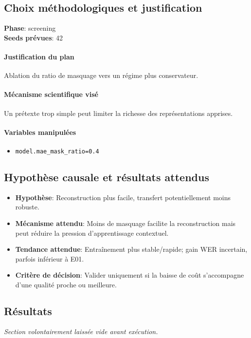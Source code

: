 \documentclass[11pt,a4paper]{article}
\begin{document}
\subsection{Choix méthodologiques et justification}
\textbf{Phase}: screening\\
\textbf{Seeds prévues}: 42\\


\paragraph{Justification du plan}
Ablation du ratio de masquage vers un régime plus conservateur.

\paragraph{Mécanisme scientifique visé}
Un prétexte trop simple peut limiter la richesse des représentations apprises.

\paragraph{Variables manipulées}
\begin{itemize}
\item \texttt{model.mae\_mask\_ratio=0.4}
\end{itemize}

\subsection{Hypothèse causale et résultats attendus}
\begin{itemize}[leftmargin=1.2cm]
\item \textbf{Hypothèse}: Reconstruction plus facile, transfert potentiellement moins robuste.
\item \textbf{Mécanisme attendu}: Moins de masquage facilite la reconstruction mais peut réduire la pression d'apprentissage contextuel.
\item \textbf{Tendance attendue}: Entraînement plus stable/rapide; gain WER incertain, parfois inférieur à E01.
\item \textbf{Critère de décision}: Valider uniquement si la baisse de coût s'accompagne d'une qualité proche ou meilleure.
\end{itemize}

\subsection{Résultats}
\textit{Section volontairement laissée vide avant exécution.}
\end{document}
